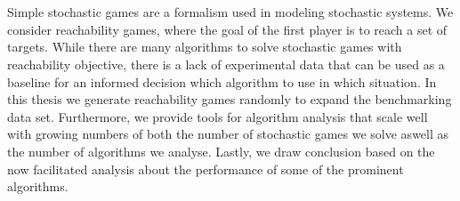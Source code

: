 \chapter*{\abstractname}
Simple stochastic games are a formalism used in modeling stochastic systems. 
We consider reachability games, where the goal of the first player is to reach a set of targets.
While there are many algorithms to solve stochastic games with reachability objective, 
there is a lack of experimental data that can be used as a baseline for an informed decision which algorithm to use in which situation.
In this thesis we generate reachability games randomly to expand the benchmarking data set.
Furthermore, we provide tools for algorithm analysis that scale well
with growing numbers of both the number of stochastic games we solve aswell as the number of algorithms we analyse.
Lastly, we draw conclusion based on the now facilitated analysis about the performance of some of the prominent algorithms.